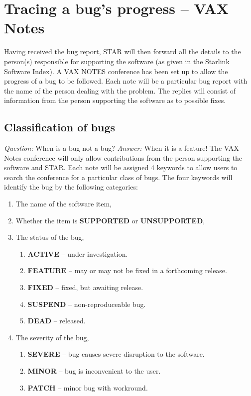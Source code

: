 \section{Tracing a bug's progress -- VAX Notes}
Having received the bug report, STAR will then forward all the details to the
person(s) responsible for supporting the software (as given in the Starlink
Software Index). A VAX NOTES conference has been set up to allow the
progress of a bug to be followed. Each note will be a particular 
bug report
with the name of the person dealing with the problem. The replies will consist
of information from the person supporting the software as to possible fixes.

\subsection{Classification of bugs}
{\em Question:} When is a bug not a bug? {\em Answer:} When it is a feature!
The VAX Notes conference will only allow contributions from the person
supporting the software and STAR. Each note will be assigned 4 keywords to
allow users to search the conference for a particular class of bugs.
\newpage
The four keywords will identify the bug by the following categories:
\begin{enumerate}
\item The name of the software item,
\item Whether the item is {\bf SUPPORTED} or {\bf UNSUPPORTED},
\item The  status of the bug, 
\begin{enumerate}
\item {\bf ACTIVE} -- under investigation.
\item {\bf FEATURE} -- may or may not be fixed in a forthcoming release.
\item {\bf FIXED} -- fixed, but awaiting release.
\item {\bf SUSPEND} -- non-reproduceable bug.
\item {\bf DEAD} -- released.
\end{enumerate}
\item The severity of the bug,
\begin{enumerate}
\item {\bf SEVERE} -- bug causes severe disruption to the software.
\item {\bf MINOR} -- bug is inconvenient to the user.
\item {\bf PATCH} -- minor bug with workround.
\end{enumerate}
\end{enumerate}
